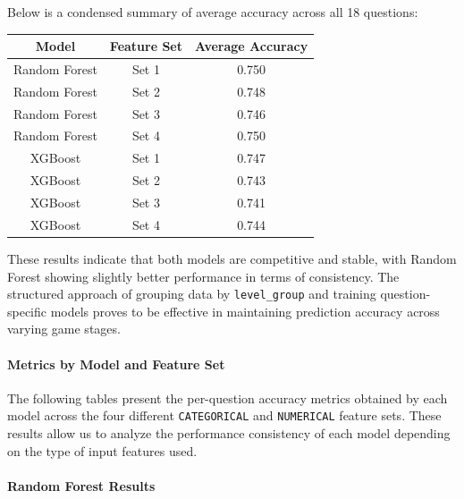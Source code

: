 \documentclass[12pt]{article}
\begin{document}
\noindent Below is a condensed summary of average accuracy across all 18 questions:

\begin{center}
\begin{tabular}{|c|c|c|}
\hline
\textbf{Model} & \textbf{Feature Set} & \textbf{Average Accuracy} \\
\hline
Random Forest & Set 1 & 0.750 \\
Random Forest & Set 2 & 0.748 \\
Random Forest & Set 3 & 0.746 \\
Random Forest & Set 4 & 0.750 \\
\hline
XGBoost       & Set 1 & 0.747 \\
XGBoost       & Set 2 & 0.743 \\
XGBoost       & Set 3 & 0.741 \\
XGBoost       & Set 4 & 0.744 \\
\hline
\end{tabular}
\end{center}

\vspace{0.5em}
These results indicate that both models are competitive and stable, with Random Forest showing slightly better performance in terms of consistency. The structured approach of grouping data by \texttt{level\_group} and training question-specific models proves to be effective in maintaining prediction accuracy across varying game stages.

\paragraph{Metrics by Model and Feature Set}

The following tables present the per-question accuracy metrics obtained by each model across the four different \texttt{CATEGORICAL} and \texttt{NUMERICAL} feature sets. These results allow us to analyze the performance consistency of each model depending on the type of input features used.

\paragraph{Random Forest Results}\mbox{}\\
\end{document}
